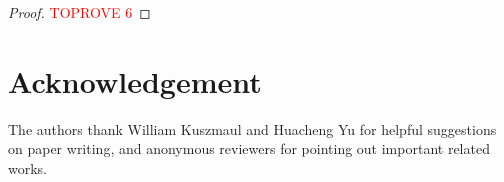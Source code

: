 \documentclass{article}
\theoremstyle{plain}
\theoremstyle{definition}  \newtheorem{definition}[theorem]{Definition}
\begin{document}
\thmPartialSum*

\begin{proof}\textcolor{red}{TOPROVE 6}\end{proof}
 
\section*{Acknowledgement}

The authors thank William Kuszmaul and Huacheng Yu for helpful suggestions on paper writing, and anonymous reviewers for pointing out important related works.



\end{document}
